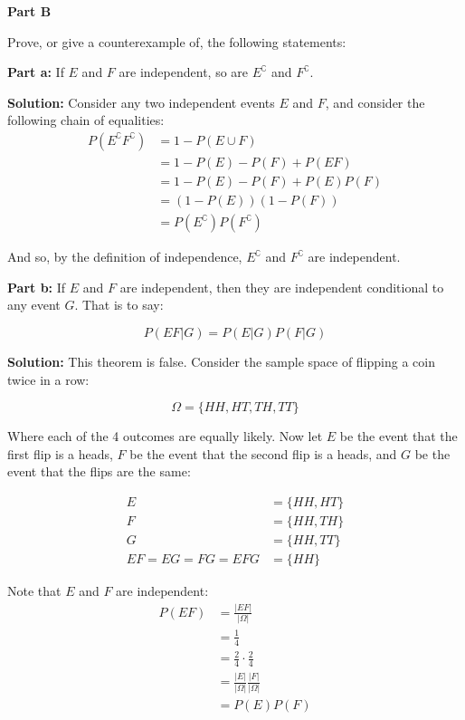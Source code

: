 \documentclass{article}
\begin{document}
\begin{center}
    \Large{\textbf{Part B}}
\end{center}
Prove, or give a counterexample of, the following statements:
\bigskip

\noindent\textbf{Part a:} If $E$ and $F$ are independent, so are $E^\complement$ and $F^\complement$.
\bigskip

\noindent\textbf{Solution:} Consider any two independent events $E$ and $F$, and consider the following chain of equalities:
\begin{align*}
    P(E^\complement F^\complement)&=1-P(E\cup F)\tag{def. of complement}\\
    &=1-P(E)-P(F)+P(EF)\tag{inclusion-exclusion $n=2$}\\
    &=1-P(E)-P(F)+P(E)P(F)\tag{$E$ and $F$ are independent}\\
    &=(1-P(E))(1-P(F))\tag{algebra}\\
    &=P(E^\complement)P(F^\complement)\tag{def. of complement}
\end{align*}

And so, by the definition of independence, $E^\complement$ and $F^\complement$ are independent.
\bigskip

\noindent\textbf{Part b:} If $E$ and $F$ are independent, then they are independent conditional to any event $G$. That is to say:

\begin{equation*}
    P(EF|G)=P(E|G)P(F|G)
\end{equation*}

\noindent\textbf{Solution:} This theorem is false. Consider the sample space of flipping a coin twice in a row:

\begin{equation*}
    \Omega=\{HH,HT,TH,TT\}
\end{equation*}

Where each of the 4 outcomes are equally likely. Now let $E$ be the event that the first flip is a heads, $F$ be the event that the second flip is a heads, and $G$ be the event that the flips are the same:

\begin{align*}
    E&=\{HH,HT\}\\
    F&=\{HH,TH\}\\
    G&=\{HH,TT\}\\
    EF=EG=FG=EFG&=\{HH\}
\end{align*}

Note that $E$ and $F$ are independent:
\begin{align*}
    P(EF)&=\frac{|EF|}{|\Omega|}\tag{discrete uniform distribution}\\
    &=\frac{1}{4}\\
    &=\frac{2}{4}\cdot\frac{2}{4}\tag{arithmetic}\\
    &=\frac{|E|}{|\Omega|}\frac{|F|}{|\Omega|}\\
    &=P(E)P(F)\tag{discrete uniform distribution}
\end{align*}
\end{document}
